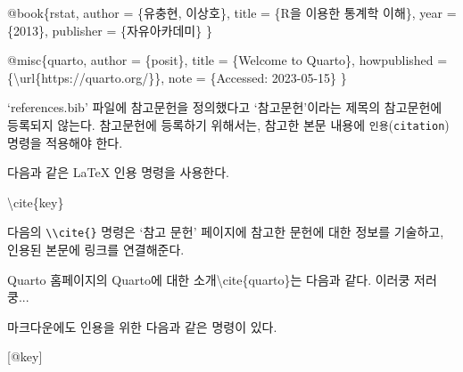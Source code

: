 \documentclass[
  letterpaper,
]{book}
\newenvironment{Shaded}{\begin{snugshade}}{\end{snugshade}}
\newcommand{\CommentTok}[1]{\textcolor[rgb]{0.37,0.37,0.37}{#1}}
\newcommand{\DataTypeTok}[1]{\textcolor[rgb]{0.68,0.00,0.00}{#1}}
\newcommand{\ErrorTok}[1]{\textcolor[rgb]{0.68,0.00,0.00}{#1}}
\newcommand{\ExtensionTok}[1]{\textcolor[rgb]{0.00,0.23,0.31}{#1}}
\newcommand{\FunctionTok}[1]{\textcolor[rgb]{0.28,0.35,0.67}{#1}}
\newcommand{\KeywordTok}[1]{\textcolor[rgb]{0.00,0.23,0.31}{#1}}
\newcommand{\NormalTok}[1]{\textcolor[rgb]{0.00,0.23,0.31}{#1}}
\newcommand{\OtherTok}[1]{\textcolor[rgb]{0.00,0.23,0.31}{#1}}
\begin{document}
\begin{Shaded}
\begin{Highlighting}[]
\ExtensionTok{@book\{rstat,}
  \ExtensionTok{author}\NormalTok{ = \{유충현, 이상호\},}
  \ExtensionTok{title}\NormalTok{ = \{R을 이용한 통계학 이해\},}
  \ExtensionTok{year}\NormalTok{ = \{2013\},}
  \ExtensionTok{publisher}\NormalTok{ = \{자유아카데미\}}
\ErrorTok{\}}

\ExtensionTok{@misc\{quarto,}
  \ExtensionTok{author}\NormalTok{ = \{posit\},}
  \ExtensionTok{title}\NormalTok{ = \{Welcome to Quarto\},}
  \ExtensionTok{howpublished}\NormalTok{ = \{}\DataTypeTok{\textbackslash{}u}\NormalTok{rl\{https://quarto.org/\}\},}
  \ExtensionTok{note}\NormalTok{ = \{Accessed: 2023{-}05{-}15\}}
\ErrorTok{\}}
\end{Highlighting}
\end{Shaded}

`references.bib' 파일에 참고문헌을 정의했다고 `참고문헌'이라는 제목의
참고문헌에 등록되지 않는다. 참고문헌에 등록하기 위해서는, 참고한 본문
내용에 \texttt{인용}(\texttt{citation})
명령을 적용해야 한다.

다음과 같은 LaTeX 인용 명령을 사용한다.

\begin{Shaded}
\begin{Highlighting}[]
\KeywordTok{\textbackslash{}cite}\NormalTok{\{}\ExtensionTok{key}\NormalTok{\}}
\end{Highlighting}
\end{Shaded}

다음의 \texttt{\textbackslash{}\textbackslash{}cite\{\}} 명령은 `참고
문헌' 페이지에 참고한 문헌에 대한 정보를 기술하고, 인용된 본문에 링크를
연결해준다.

\begin{Shaded}
\begin{Highlighting}[]
\NormalTok{Quarto 홈페이지의 Quarto에 대한 소개}\FunctionTok{\textbackslash{}cite}\NormalTok{\{quarto\}는 다음과 같다. 이러쿵 저러쿵...}
\end{Highlighting}
\end{Shaded}

마크다운에도 인용을 위한 다음과 같은 명령이 있다.

\begin{Shaded}
\begin{Highlighting}[]
\CommentTok{[}\OtherTok{@key}\CommentTok{]}
\end{Highlighting}
\end{Shaded}
\end{document}
